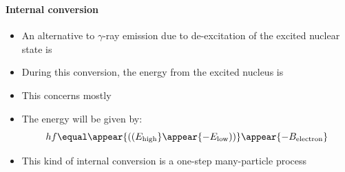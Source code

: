 \begin{frame}
\frametitle{\texorpdfstring{\culine[\sectiontitleulinecolor]{\sectiontitle}}{\sectiontitle} }
\framesubtitle{Internal conversion}

\begin{itemize}
	\item An alternative to $\gamma$-ray emission due to de-excitation of the excited nuclear state is 

\item During this conversion, the energy from the excited nucleus is  
 
 \item This concerns mostly  
 
 \item The energy will be given by:
\[
hf  \equal \appear{ \textrm{((} E_{\text {high}}}\appear{-E_{\text {low}} \textrm{))}} \appear{-B_{\text {electron}}}
\]

\item This kind of internal conversion is a one-step many-particle process
\end{itemize}


\endofslide 
\end{frame}

